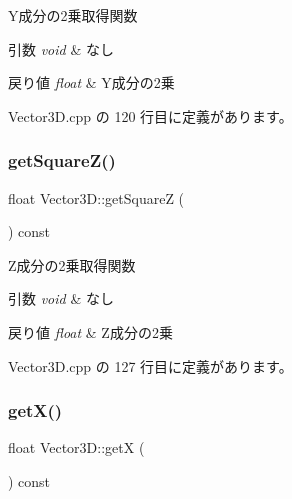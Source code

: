 Y成分の2乗取得関数 


\begin{DoxyParams}{引数}
{\em void} & なし \\
\hline
\end{DoxyParams}

\begin{DoxyRetVals}{戻り値}
{\em float} & Y成分の2乗 \\
\hline
\end{DoxyRetVals}


 Vector3\+D.\+cpp の 120 行目に定義があります。

\mbox{\label{class_vector3_d_ae38a3a196d197225be9a53110e4210ea}} 
\subsubsection{\texorpdfstring{get\+Square\+Z()}{getSquareZ()}}
{\footnotesize\ttfamily float Vector3\+D\+::get\+SquareZ (\begin{DoxyParamCaption}{ }\end{DoxyParamCaption}) const}



Z成分の2乗取得関数 


\begin{DoxyParams}{引数}
{\em void} & なし \\
\hline
\end{DoxyParams}

\begin{DoxyRetVals}{戻り値}
{\em float} & Z成分の2乗 \\
\hline
\end{DoxyRetVals}


 Vector3\+D.\+cpp の 127 行目に定義があります。

\mbox{\label{class_vector3_d_a1c2679622aef3b49ed30857ca3eda472}} 
\subsubsection{\texorpdfstring{get\+X()}{getX()}}
{\footnotesize\ttfamily float Vector3\+D\+::getX (\begin{DoxyParamCaption}{ }\end{DoxyParamCaption}) const}



